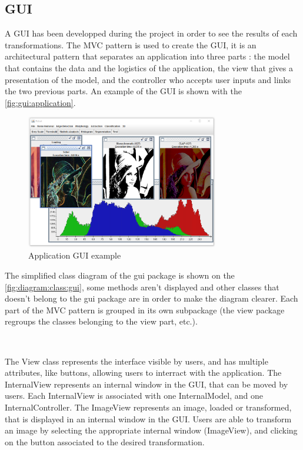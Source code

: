 \subsection{GUI}

A \gls{GUI} has been developped during the project in order to see the results of each transformations. The \gls{MVC} pattern is used to create the \gls{GUI}, it is an architectural pattern that separates an application into three parts : the model that contains the data and the logistics of the application, the view that gives a presentation of the model, and the controller who accepts user inputs and links the two previous parts. An example of the \gls{GUI} is shown with the \vref{fig:gui:application}.


\begin{figure}[H]
	\centering
	\includegraphics[width=0.75\textwidth]{images/application/application}
	\caption{Application GUI example}
	\label{fig:gui:application}
\end{figure}


The simplified class diagram of the gui package is shown on the \vref{fig:diagram:class:gui}, some methods aren't displayed and other classes that doesn't belong to the gui package are in order to make the diagram clearer. Each part of the \gls{MVC} pattern is grouped in its own subpackage (the view package regroups the classes belonging to the view part, etc.). 

~~

The View class represents the interface visible by users, and has multiple attributes, like buttons, allowing users to interract with the application. The InternalView represents an internal window in the \gls{GUI}, that can be moved by users. Each InternalView is associated with one InternalModel, and one InternalController. The ImageView represents an image, loaded or transformed, that is displayed in an internal window in the \gls{GUI}. Users are able to transform an image by selecting the appropriate internal window (ImageView), and clicking on the button associated to the desired transformation. 


